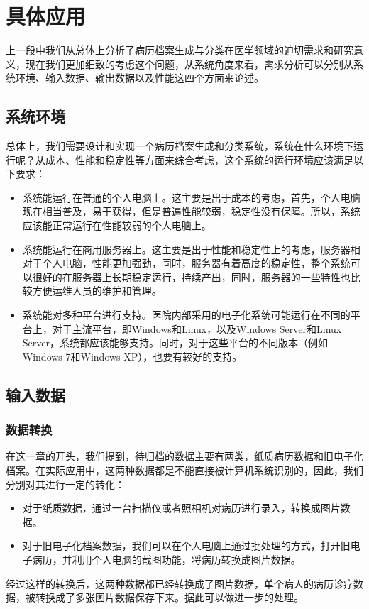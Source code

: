 \section{具体应用}
上一段中我们从总体上分析了病历档案生成与分类在医学领域的迫切需求和研究意义，现在我们更加细致的考虑这个问题，从系统角度来看，需求分析可以分别从系统环境、输入数据、输出数据以及性能这四个方面来论述。

\subsection{系统环境}
总体上，我们需要设计和实现一个病历档案生成和分类系统，系统在什么环境下运行呢？从成本、性能和稳定性等方面来综合考虑，这个系统的运行环境应该满足以下要求：
\begin{itemize}
	\item 系统能运行在普通的个人电脑上。这主要是出于成本的考虑，首先，个人电脑现在相当普及，易于获得，但是普遍性能较弱，稳定性没有保障。所以，系统应该能正常运行在性能较弱的个人电脑上。
	\item 系统能运行在商用服务器上。这主要是出于性能和稳定性上的考虑，服务器相对于个人电脑，性能更加强劲，同时，服务器有着高度的稳定性，整个系统可以很好的在服务器上长期稳定运行，持续产出，同时，服务器的一些特性也比较方便运维人员的维护和管理。
	\item 系统能对多种平台进行支持。医院内部采用的电子化系统可能运行在不同的平台上，对于主流平台，即Windows和Linux，以及Windows Server和Linux Server，系统都应该能够支持。同时，对于这些平台的不同版本（例如Windows 7和Windows XP），也要有较好的支持。
\end{itemize}

\subsection{输入数据}
\subsubsection*{数据转换}
在这一章的开头，我们提到，待归档的数据主要有两类，纸质病历数据和旧电子化档案。在实际应用中，这两种数据都是不能直接被计算机系统识别的，因此，我们分别对其进行一定的转化：
\begin{itemize}
	\item 对于纸质数据，通过一台扫描仪或者照相机对病历进行录入，转换成图片数据。
	\item 对于旧电子化档案数据，我们可以在个人电脑上通过批处理的方式，打开旧电子病历，并利用个人电脑的截图功能，将病历转换成图片数据。
\end{itemize}
经过这样的转换后，这两种数据都已经转换成了图片数据，单个病人的病历诊疗数据，被转换成了多张图片数据保存下来。据此可以做进一步的处理。

